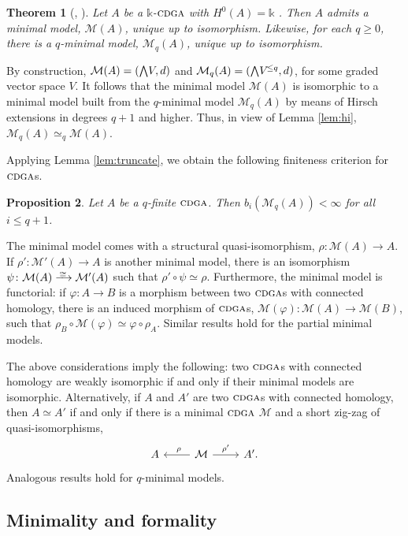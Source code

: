 \documentclass{article}
\numberwithin{equation}{section}
\newtheorem{theorem}{Theorem}[section]
\newtheorem{proposition}[theorem]{Proposition}
\theoremstyle{definition}
\renewcommand{\k}{\mathbb{k}}
\newcommand{\M}{\mathcal{M}}
\newcommand{\cdga}{\ensuremath{\textsc{cdga}}}
\newcommand{\isom}{\xrightarrow{
   \,\smash{\raisebox{-0.4ex}{\ensuremath{\scriptstyle\cong}}}\,}}
\newcommand{\bwedge}{\mbox{\normalsize $\bigwedge$}}
\begin{document}
\begin{theorem}[\cite{Mo}, \cite{Sullivan77}]
\label{thm:mm} 
Let $A$ be a $\k$-$\cdga$ with $H^{0}(A)=\k$ . Then $A$ admits a minimal model, 
$\M(A)$, unique up to isomorphism. Likewise, for each $q\ge 0$, there is a 
$q$-minimal model, $\M_q(A)$, unique up to isomorphism.
\end{theorem}

By construction, $\M(A)=(\bwedge V,d)$ and $\M_q(A)=(\bwedge V^{\! \le q},d)$, 
for some graded vector space $V$. It follows that the minimal model  
$\M(A)$ is isomorphic to a minimal model built from the $q$-minimal 
model $\M_q(A)$ by means of Hirsch extensions in degrees $q+1$ 
and higher.  Thus, in view of Lemma \ref{lem:hi}, $\M_q(A)\simeq_{q} \M(A)$.  

Applying Lemma \ref{lem:truncate}, we obtain the following finiteness 
criterion for $\cdga$s.

\begin{proposition}
\label{prop:betti-minimal}
Let $A$ be a $q$-finite $\cdga$. Then $b_{i}(\mathcal{M}_q(A))<\infty$ for all $i\le q+1$.
\end{proposition}

The minimal model comes with a structural 
quasi-isomorphism, $\rho\colon \M(A)\to A$. If $\rho'\colon \M'(A)\to A$ 
is another minimal model, there is an isomorphism $\psi\colon \M(A)\isom \M'(A)$ 
such that $\rho'\circ \psi\simeq \rho$. Furthermore, the minimal model is functorial: 
if $\varphi\colon A\to B$ is a morphism between two $\cdga$s with 
connected homology, there is an induced morphism of $\cdga$s, 
$\M(\varphi)\colon \M(A)\to \M(B)$, such that $\rho_B\circ \M(\varphi) \simeq
\varphi\circ \rho_A$. Similar results hold for the partial minimal models.

The above considerations imply the following: 
two $\cdga$s with connected homology are weakly isomorphic  
if and only if their minimal models are isomorphic.  
Alternatively, if $A$ and $A'$ are two $\cdga$s with connected homology, 
then $A\simeq A'$  if and only if there is a minimal 
$\cdga$ $\M$ and a short zig-zag of quasi-isomorphisms, 
\begin{equation}
\label{eq:amqa}
\begin{tikzcd}[column sep=24pt]
A  & \mathcal{M}\ar[r, "\rho'"]  \ar[l, "\ \rho" ']  & A'.
\end{tikzcd}
\end{equation}
Analogous results hold for $q$-minimal models.


\subsection{Minimality and formality}
\label{subsec:minmod-formal}
\end{document}
